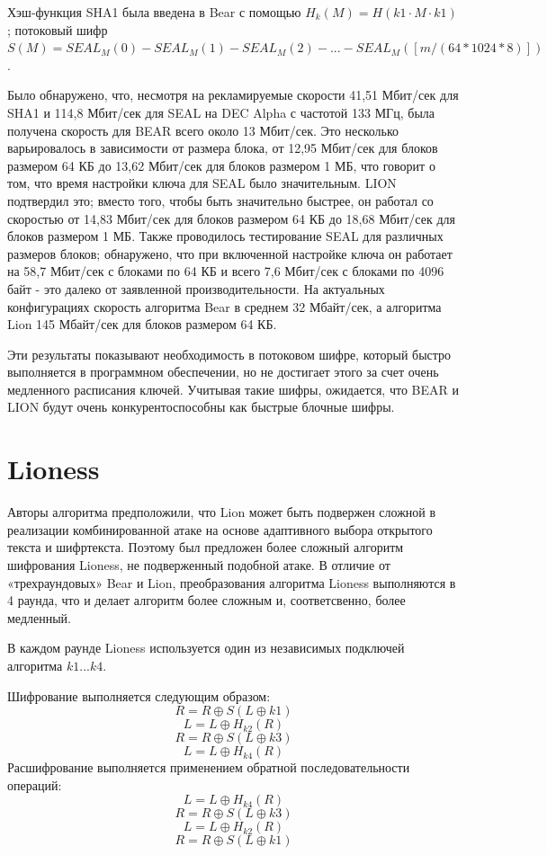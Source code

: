 \documentclass[12pt]{article}
\begin{document}
Хэш-функция SHA1 была введена в Bear с помощью $H_{k}(M) = {H(k1\cdot M \cdot k1)}$; потоковый шифр $S(M) = SEAL_{M}(0) - SEAL_{M}(1) - SEAL_{M}(2) - ... - SEAL_{M}([m/(64*1024*8)])$.

Было обнаружено, что, несмотря на рекламируемые скорости 41,51 Мбит/сек для SHA1 и 114,8 Мбит/сек для SEAL на DEC Alpha с частотой 133 МГц, была получена скорость для BEAR всего около 13 Мбит/сек. Это несколько варьировалось в зависимости от размера блока, от 12,95 Мбит/сек для блоков размером 64 КБ до 13,62 Мбит/сек для блоков размером 1 МБ, что говорит о том, что время настройки ключа для SEAL было значительным. LION подтвердил это; вместо того, чтобы быть значительно быстрее, он работал со скоростью от 14,83 Мбит/сек для блоков размером 64 КБ до 18,68 Мбит/сек для блоков размером 1 МБ. Также проводилось тестирование SEAL для различных размеров блоков; обнаружено, что при включенной настройке ключа он работает на 58,7 Мбит/сек с блоками по 64 КБ и всего 7,6 Мбит/сек с блоками по 4096 байт - это далеко от заявленной производительности.
На актуальных конфигурациях скорость алгоритма Bear в среднем 32 Мбайт/сек, а алгоритма Lion 145 Мбайт/сек для блоков размером 64 КБ.

Эти результаты показывают необходимость в потоковом шифре, который быстро выполняется в программном
обеспечении, но не достигает этого за счет очень медленного расписания ключей. Учитывая такие шифры, ожидается, что BEAR и LION будут очень конкурентоспособны как быстрые блочные шифры.

\section{Lioness}

Авторы алгоритма предположили, что Lion может быть подвержен сложной в реализации комбинированной атаке на основе адаптивного выбора открытого текста и шифртекста. Поэтому был предложен более сложный алгоритм шифрования Lioness, не подверженный подобной атаке. В отличие от «трехраундовых» Bear и Lion, преобразования алгоритма
Lioness выполняются в 4 раунда, что и делает алгоритм более сложным и, соответсвенно, более медленный.

В каждом раунде Lioness используется один из независимых подключей алгоритма $k1...k4$. 

Шифрование выполняется следующим образом:
\[R = R\oplus S(L\oplus k1)\]
\[L = L\oplus H_{k2}(R)\]
\[R = R\oplus S(L\oplus k3)\]
\[L = L\oplus H_{k4}(R)\]
\newpage
Расшифрование выполняется применением обратной последовательности операций:
\[L = L\oplus H_{k4}(R)\]
\[R = R\oplus S(L\oplus k3)\]
\[L = L\oplus H_{k2}(R)\]
\[R = R\oplus S(L\oplus k1)\]
\end{document}
